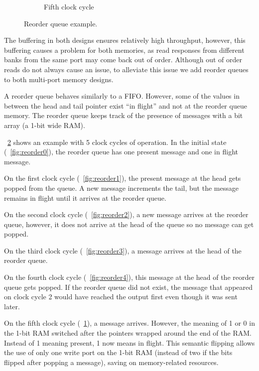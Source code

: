 \begin{figure}
\begin{subfigure}{.32\linewidth}
\begin{tikzpicture}
            \end{tikzpicture}
            \caption{Fifth clock cycle}
            \label{fig:reorder5}
        \end{subfigure}
        \caption[The reorder queue]{Reorder queue example.}
        \label{fig:reorder}
    \end{figure}

    The buffering in both designs ensures relatively high throughput, however, this buffering causes a problem for both memories, as read responses from different banks from the same port may come back out of order. Although out of order reads do not always cause an issue, to alleviate this issue we add reorder queues to both multi-port memory designs.

    A reorder queue behaves similarly to a FIFO. However, some of the values in between the head and tail pointer exist ``in flight'' and not at the reorder queue memory. The reorder queue keeps track of the presence of messages with a bit array (a 1-bit wide RAM).

    \figurename~\ref{fig:reorder} shows an example with 5 clock cycles of operation. In the initial state (\figurename~\ref{fig:reorder0}), the reorder queue has one present message and one in flight message.

         On the first clock cycle (\figurename~\ref{fig:reorder1}), the present message at the head gets popped from the queue. A new message increments the tail, but the message remains in flight until it arrives at the reorder queue.

         On the second clock cycle (\figurename~\ref{fig:reorder2}), a new message arrives at the reorder queue, however, it does not arrive at the head of the queue so no message can get popped.

         On the third clock cycle (\figurename~\ref{fig:reorder3}), a message arrives at the head of the reorder queue.

         On the fourth clock cycle (\figurename~\ref{fig:reorder4}), this message at the head of the reorder queue gets popped. If the reorder queue did not exist, the message that appeared on clock cycle 2 would have reached the output first even though it was sent later.

         On the fifth clock cycle (\figurename~\ref{fig:reorder5}), a message arrives. However, the meaning of 1 or 0 in the 1-bit RAM switched after the pointers wrapped around the end of the RAM. Instead of 1 meaning present, 1 now means in flight. This semantic flipping allows the use of only one write port on the 1-bit RAM (instead of two if the bits flipped after popping a message), saving on memory-related resources. 

